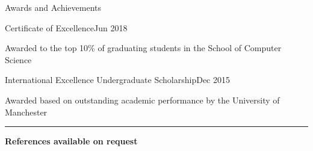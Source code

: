 \documentclass{techresume} %
\begin{document}

\begin{rSection}{Awards and Achievements}

\begin{rSubsection}{Certificate of Excellence}{Jun 2018}{}{}
\item[] Awarded to the top 10\% of graduating students in the School of Computer Science
\end{rSubsection}

\begin{rSubsection}{International Excellence Undergraduate Scholarship}{Dec 2015}{}{}
\item[] Awarded based on outstanding academic performance by the University of Manchester
\end{rSubsection}

\end{rSection}


\sectionskip
\sectionlineskip
\hrule
{\bf References available on request}
\end{document}
